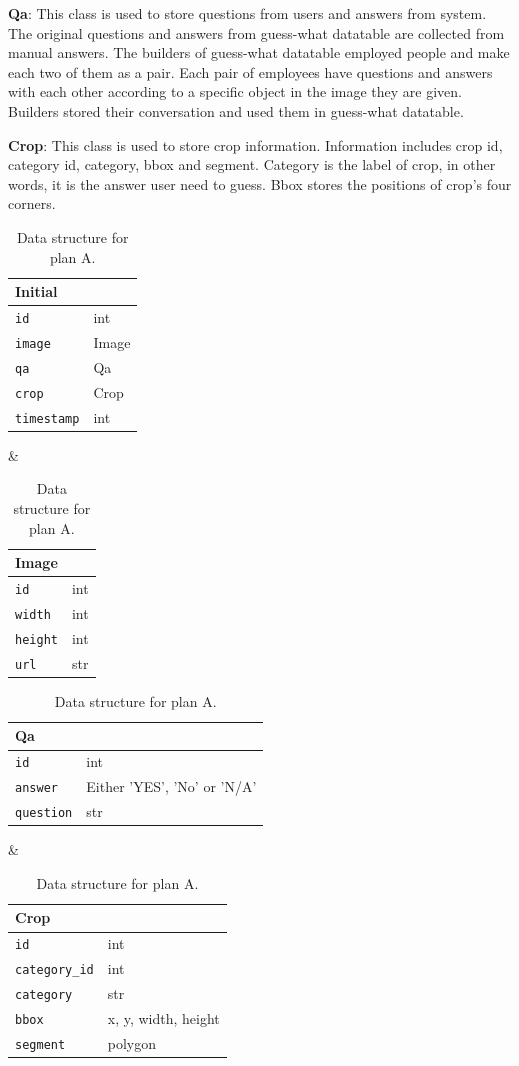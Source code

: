 \documentclass[11pt,a4paper]{article}
\begin{document}
{\bf Qa}: This class is used to store questions from users and answers from system. The original questions and answers from guess-what datatable are collected from manual answers. The builders of guess-what datatable employed people and make each two of them as a pair. Each pair of employees have questions and answers with each other according to a specific object in the image they are given. Builders stored their conversation and used them in guess-what datatable.

{\bf Crop}: This class is used to store crop information. Information includes crop id, category id, category, bbox and segment. Category is the label of crop, in other words, it is the answer user need to guess. Bbox stores the positions of crop's four corners.

\begin{table}
\centering
\begin{tabular}{|l|l|}
\hline
{\bf Initial} & {\bf }\\\hline
\verb|id| & {int} \\
\verb|image| & {Image} \\
\verb|qa| & {Qa} \\
\verb|crop| & {Crop} \\
\verb|timestamp| & {int} \\\hline
\end{tabular} &
\begin{tabular}{|l|l|}
\hline
{\bf Image} & {\bf}\\\hline
\verb|id| & {int} \\
\verb|width| & {int} \\
\verb|height| & {int} \\
\verb|url| & {str} \\\hline
\end{tabular}
\begin{tabular}{|l|l|}
\hline
{\bf Qa} & {\bf }\\\hline
\verb|id| & {int} \\
\verb|answer| & {Either 'YES', 'No' or 'N/A'} \\
\verb|question| & {str} \\\hline
\end{tabular} &
\begin{tabular}{|l|l|}
\hline
{\bf Crop} & {\bf}\\\hline
\verb|id| & {int} \\
\verb|category_id| & {int} \\
\verb|category| & {str} \\
\verb|bbox| & {x, y, width, height} \\
\verb|segment| & {polygon} \\\hline
\end{tabular}
\caption{Data structure for plan A.}\label{tab:accents}
\end{table}
\end{document}
